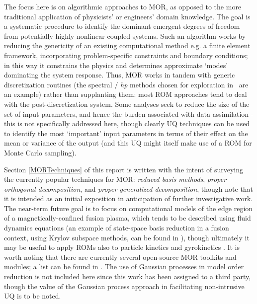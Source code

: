 The focus here is on algorithmic approaches to MOR, as opposed to the more traditional application of physicists' or engineers' domain knowledge.  
The goal is a systematic procedure to identify the dominant emergent degrees of freedom from potentially highly-nonlinear coupled systems.  
Such an algorithm works by reducing the genericity of an existing computational method e.g. a finite element framework, incorporating problem-specific constraints and boundary conditions; in this way it constrains the physics and determines approximate `modes' dominating the system response.  
Thus, MOR works in tandem with generic discretization routines (the spectral / {\it hp} methods chosen for exploration in \nep\ are an example) rather than supplanting them: most ROM approaches tend to deal with the post-discretization system.  
Some analyses seek to reduce the size of the set of input parameters, and hence the burden associated with data assimilation - this is not specifically addressed here, though clearly UQ techniques can be used to identify the most `important' input parameters in terms of their effect on the mean or variance of the output (and this UQ might itself make use of a ROM for Monte Carlo sampling).

Section \ref{MORTechniques} of this report is written with the intent of surveying the currently popular techniques for MOR: {\it reduced basis methods}, {\it proper orthogonal decomposition}, and {\it proper generalized decomposition}, though note that it is intended as an initial exposition in anticipation of further investigative work.  
The near-term future goal is to focus on computational models of the edge region of a magnetically-confined fusion plasma, which tends to be described using fluid dynamics equations (an example of state-space basis reduction in a fusion context, using Krylov subspace methods, can be found in \cite{bo17mode}), though ultimately it may be useful to apply ROMs also to particle kinetics \cite{ni19mode} and gyrokinetics \cite{gi21mode}.  
It is worth noting that there are currently several open-source MOR toolkits and modules; a list can be found in \cite{morwiki}.  
The use of Gaussian processes in model order reduction is not included here since this work has been assigned to a third party, though the value of the Gaussian process approach in facilitating non-intrusive UQ is to be noted.

